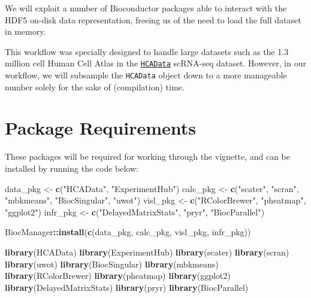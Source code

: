 \documentclass[]{book}
\newenvironment{Shaded}{\begin{snugshade}}{\end{snugshade}}
\newcommand{\KeywordTok}[1]{\textcolor[rgb]{0.13,0.29,0.53}{\textbf{#1}}}
\newcommand{\NormalTok}[1]{#1}
\newcommand{\OperatorTok}[1]{\textcolor[rgb]{0.81,0.36,0.00}{\textbf{#1}}}
\newcommand{\StringTok}[1]{\textcolor[rgb]{0.31,0.60,0.02}{#1}}
\begin{document}
We will exploit a number of Bioconductor packages able to interact with the HDF5 on-disk data representation, freeing us of the need to load the full dataset in memory.

This workflow was specially designed to handle large datasets such as the 1.3 million cell Human Cell Atlas in the \href{https://bioconductor.org/packages/devel/data/experiment/html/HCAData.html}{\texttt{HCAData}} scRNA-seq dataset. However, in our workflow, we will subsample the \texttt{HCAData} object down to a more manageable number solely for the sake of (compilation) time.

\hypertarget{package-requirements}{%
\section{Package Requirements}\label{package-requirements}}

These packages will be required for working through the vignette, and can be installed by running the code below:

\begin{Shaded}
\begin{Highlighting}[]
\NormalTok{data_pkg <-}\StringTok{ }\KeywordTok{c}\NormalTok{(}\StringTok{"HCAData"}\NormalTok{, }\StringTok{"ExperimentHub"}\NormalTok{)}
\NormalTok{calc_pkg <-}\StringTok{ }\KeywordTok{c}\NormalTok{(}\StringTok{"scater"}\NormalTok{, }\StringTok{"scran"}\NormalTok{, }\StringTok{"mbkmeans"}\NormalTok{, }\StringTok{"BiocSingular"}\NormalTok{, }\StringTok{"uwot"}\NormalTok{)}
\NormalTok{visl_pkg <-}\StringTok{ }\KeywordTok{c}\NormalTok{(}\StringTok{"RColorBrewer"}\NormalTok{, }\StringTok{"pheatmap"}\NormalTok{, }\StringTok{"ggplot2"}\NormalTok{)}
\NormalTok{infr_pkg <-}\StringTok{ }\KeywordTok{c}\NormalTok{(}\StringTok{"DelayedMatrixStats"}\NormalTok{, }\StringTok{"pryr"}\NormalTok{, }\StringTok{"BiocParallel"}\NormalTok{)}

\NormalTok{BiocManager}\OperatorTok{::}\KeywordTok{install}\NormalTok{(}\KeywordTok{c}\NormalTok{(data_pkg, calc_pkg, visl_pkg, infr_pkg))}
\end{Highlighting}
\end{Shaded}

\begin{Shaded}
\begin{Highlighting}[]
\KeywordTok{library}\NormalTok{(HCAData)}
\KeywordTok{library}\NormalTok{(ExperimentHub)}
\KeywordTok{library}\NormalTok{(scater)}
\KeywordTok{library}\NormalTok{(scran)}
\KeywordTok{library}\NormalTok{(uwot)}
\KeywordTok{library}\NormalTok{(BiocSingular)}
\KeywordTok{library}\NormalTok{(mbkmeans)}
\KeywordTok{library}\NormalTok{(RColorBrewer)}
\KeywordTok{library}\NormalTok{(pheatmap)}
\KeywordTok{library}\NormalTok{(ggplot2)}
\KeywordTok{library}\NormalTok{(DelayedMatrixStats)}
\KeywordTok{library}\NormalTok{(pryr)}
\KeywordTok{library}\NormalTok{(BiocParallel)}
\end{Highlighting}
\end{Shaded}
\end{document}
